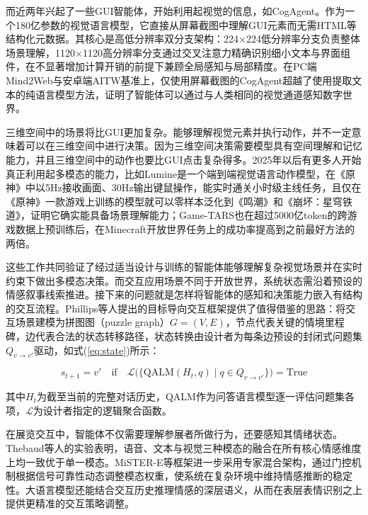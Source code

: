 \documentclass[bachelor]{njupthesis}
\begin{document}
而近两年兴起了一些GUI智能体，开始利用起视觉的信息，如CogAgent。作为一个180亿参数的视觉语言模型，它直接从屏幕截图中理解GUI元素而无需HTML等结构化元数据。其核心是高低分辨率双分支架构：224×224低分辨率分支负责整体场景理解，1120×1120高分辨率分支通过交叉注意力精确识别细小文本与界面组件，在不显著增加计算开销的前提下兼顾全局感知与局部精度。在PC端Mind2Web与安卓端AITW基准上，仅使用屏幕截图的CogAgent超越了使用提取文本的纯语言模型方法，证明了智能体可以通过与人类相同的视觉通道感知数字世界。

三维空间中的场景将比GUI更加复杂。能够理解视觉元素并执行动作，并不一定意味着可以在三维空间中进行决策。因为三维空间决策需要模型具有空间理解和记忆能力，并且三维空间中的动作也要比GUI点击复杂得多。2025年以后有更多人开始真正利用起多模态的能力，比如Lumine是一个端到端视觉语言动作模型，在《原神》中以5Hz接收画面、30Hz输出键鼠操作，能实时通关小时级主线任务，且仅在《原神》一款游戏上训练的模型就可以零样本泛化到《鸣潮》和《崩坏：星穹铁道》，证明它确实能具备场景理解能力；Game-TARS也在超过5000亿token的跨游戏数据上预训练后，在Minecraft开放世界任务上的成功率提高到之前最好方法的两倍。

这些工作共同验证了经过适当设计与训练的智能体能够理解复杂视觉场景并在实时约束下做出多模态决策。而交互应用场景不同于开放世界，系统状态需沿着预设的情感叙事线索推进。接下来的问题就是怎样将智能体的感知和决策能力嵌入有结构的交互流程。Phillips等人提出的目标导向交互框架提供了值得借鉴的思路：将交互场景建模为拼图图（puzzle graph）$G = (V, E)$，节点代表关键的情境里程碑，边代表合法的状态转移路径，状态转换由设计者为每条边预设的封闭式问题集$Q_{v \rightarrow v'}$驱动，如式(\ref{eq:state})所示：

\begin{equation}
s_{t+1} = v' \quad \text{if} \quad \mathcal{L}\Big(\big\{\text{QALM}(H_t, q) \mid q \in Q_{v \rightarrow v'}\big\}\Big) = \text{True}
\label{eq:state}
\end{equation}

其中$H_t$为截至当前的完整对话历史，QALM作为问答语言模型逐一评估问题集各项，$\mathcal{L}$为设计者指定的逻辑聚合函数。

在展览交互中，智能体不仅需要理解参展者所做行为，还要感知其情绪状态。Thebaud等人的实验表明，语音、文本与视觉三种模态的融合在所有核心情感维度上均一致优于单一模态。MiSTER-E等框架进一步采用专家混合架构，通过门控机制根据信号可靠性动态调整模态权重，使系统在复杂环境中维持情感推断的稳定性。大语言模型还能结合交互历史推理情感的深层语义，从而在表层表情识别之上提供更精准的交互策略调整。
\end{document}

